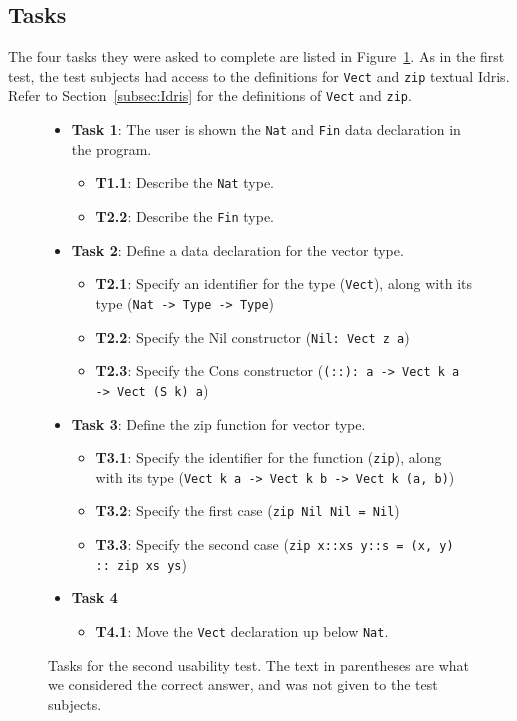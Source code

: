 \subsection{Tasks}
The four tasks they were asked to complete are listed in 
Figure~\ref{figure:second_tasks}.
As in the first test, the test subjects had access to the definitions for
\texttt{Vect} and \texttt{zip} textual Idris. Refer to Section~\ref{subsec:Idris}
for the definitions of \texttt{Vect} and \texttt{zip}.

\begin{figure}
\centering
\begin{itemize}
	\item \textbf{Task 1}: The user is shown the \texttt{Nat} and \texttt{Fin} data declaration in the program.
	\begin{itemize}
		\item \textbf{T1.1}: Describe the \texttt{Nat} type.
		\item \textbf{T2.2}: Describe the \texttt{Fin} type.
	\end{itemize}
	\item \textbf{Task 2}: Define a data declaration for the vector type.
	\begin{itemize}
		\item \textbf{T2.1}: Specify an identifier for the type (\texttt{Vect}), along with its type (\texttt{Nat -> Type -> Type})
		\item \textbf{T2.2}: Specify the Nil constructor (\texttt{Nil: Vect z a})
		\item \textbf{T2.3}: Specify the Cons constructor (\texttt{(::): a -> Vect k a -> Vect (S k) a})
	\end{itemize}
	\item \textbf{Task 3}: Define the zip function for vector type.
	\begin{itemize}
		\item \textbf{T3.1}: Specify the identifier for the function (\texttt{zip}), along with its type (\texttt{Vect k a -> Vect k b -> Vect k (a, b)})
		\item \textbf{T3.2}: Specify the first case (\texttt{zip Nil Nil = Nil})
		\item \textbf{T3.3}: Specify the second case (\texttt{zip x::xs y::s = (x, y) :: zip xs ys})
	\end{itemize}
	\item \textbf{Task 4}
	\begin{itemize}
		\item \textbf{T4.1}: Move the \texttt{Vect} declaration up below \texttt{Nat}.
	\end{itemize}
\end{itemize}
\caption{Tasks for the second usability test. The text in parentheses are what we considered the correct answer, and was not given to the test subjects.}
\label{figure:second_tasks}
\end{figure}

